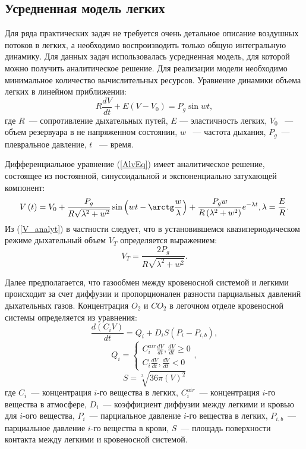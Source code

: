 \subsection{Усредненная модель легких}
\label{sec:lumpLung}
Для ряда практических задач не требуется очень детальное описание воздушных потоков в легких, а необходимо воспроизводить только общую интегральную динамику. Для данных задач использовалась усредненная модель, для которой можно получить аналитическое решение. Для реализации модели необходимо минимальное количество вычислительных ресурсов. Уравнение динамики объема легких в линейном приближении:
\begin{equation}\label{AlvEq}
R\frac{dV}{dt}+E(V-V_{0})=P_{g}\sin wt,
\end{equation}
\noindent где \( R\)~--- сопротивление дыхательных путей, \( E\) --- эластичность легких, \( V_{0}\) ~--- объем резервуара в не напряженном состоянии, \( w\) ~--- частота дыхания, \( P_{g}\)~---плевральное давление, \( t\) ~--- время. 

Дифференциальное уравнение (\ref{AlvEq}) имеет аналитическое решение, состоящее из постоянной, синусоидальной и экспоненциально затухающей компонент:
\begin{equation}\label{V_analyt}
V\left(t\right)=V_{0}+\frac{P_{g}}{R\sqrt{\lambda^2+w^2}}\sin \left( wt-\arctg\frac{w}{\lambda} \right)+\frac{P_{g}w}{R\left(\lambda^2+w^2\right)}e^{-\lambda t}, \lambda=\frac{E}{R}.
\end{equation}
Из (\ref{V_analyt}) в частности следует, что в установившемся квазипериодическом режиме дыхательный объем \( V_{T}\) определяется выражением:
\begin{equation}
V_{T}=\frac{2P_{g}}{R\sqrt{\lambda^2+w^2}}.
\end{equation}

Далее предполагается, что газообмен между кровеносной системой и легкими происходит за счет диффузии и пропорционален разности парциальных давлений дыхательных газов. Концентрация \(O_{2}\) и \( CO_{2}\) в легочном отделе кровеносной системы определяется из уравнения:
\begin{equation}\label{lungMatter1}
\frac{d\left(C_{i}V\right)}{dt}  = Q_{i}+D_{i}S\left(P_{i}-P_{i,b}\right),
\end{equation}
\begin{equation}\label{lungMatter2}
Q_{i}= \begin{cases} \displaystyle
C_{i}^{air}\frac{dV}{dt}, \frac{dV}{dt} \ge 0 \\
\displaystyle
C_{i}\frac{dV}{dt},  \frac{dV}{dt} <0
\end{cases},
\end{equation}
\begin{equation}
S =\sqrt[{3}]{36\pi \left(V \right)^{2} }
\end{equation}
\noindent где \(C_{i}\)~--- концентрация $i$-го вещества в легких, 
\( C_{i}^{air}\)~--- концентрация $i$-го вещества в атмосфере, 
\( D_{i}\)~--- коэффициент диффузии между легкими и кровью для $i$-ого вещества, 
\( P_{i}\)~--- парциальное давление $i$-го вещества в легких, 
\( P_{i,b}\)~--- парциальное давление $i$-го вещества в крови, \( S\)~--- площадь поверхности контакта между легкими и кровеносной системой. 

